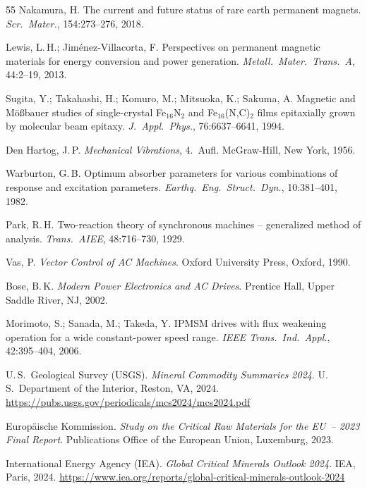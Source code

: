 ﻿\documentclass[12pt, a4paper]{report}
\theoremstyle{definition}
\theoremstyle{remark}
\begin{document}
\begin{thebibliography}{55}
  Nakamura, H.
  The current and future status of rare earth permanent magnets.
  \textit{Scr.\ Mater.}, 154:273--276, 2018.

  Lewis, L.\,H.; Jim\'enez-Villacorta, F.
  Perspectives on permanent magnetic materials for energy conversion
  and power generation.
  \textit{Metall.\ Mater.\ Trans.\ A}, 44:2--19, 2013.

  Sugita, Y.; Takahashi, H.; Komuro, M.; Mitsuoka, K.; Sakuma, A.
  Magnetic and M\"{o}\ss bauer studies of single-crystal Fe$_{16}$N$_2$ and
  Fe$_{16}$(N,C)$_2$ films epitaxially grown by molecular beam epitaxy.
  \textit{J.\ Appl.\ Phys.}, 76:6637--6641, 1994.

  Den Hartog, J.\,P.
  \textit{Mechanical Vibrations}, 4.~Aufl.
  McGraw-Hill, New York, 1956.

  Warburton, G.\,B.
  Optimum absorber parameters for various combinations of response
  and excitation parameters.
  \textit{Earthq.\ Eng.\ Struct.\ Dyn.}, 10:381--401, 1982.

  Park, R.\,H.
  Two-reaction theory of synchronous machines -- generalized method of analysis.
  \textit{Trans.\ AIEE}, 48:716--730, 1929.

  Vas, P.
  \textit{Vector Control of AC Machines}.
  Oxford University Press, Oxford, 1990.

  Bose, B.\,K.
  \textit{Modern Power Electronics and AC Drives}.
  Prentice Hall, Upper Saddle River, NJ, 2002.

  Morimoto, S.; Sanada, M.; Takeda, Y.
  IPMSM drives with flux weakening operation for a wide constant-power speed range.
  \textit{IEEE Trans.\ Ind.\ Appl.}, 42:395--404, 2006.

  U.\,S.\ Geological Survey (USGS).
  \textit{Mineral Commodity Summaries 2024}.
  U.\,S.\ Department of the Interior, Reston, VA, 2024.
  {\small\url{https://pubs.usgs.gov/periodicals/mcs2024/mcs2024.pdf}}

  Europäische Kommission.
  \textit{Study on the Critical Raw Materials for the EU~-- 2023 Final Report}.
  Publications Office of the European Union, Luxemburg, 2023.

  International Energy Agency (IEA).
  \textit{Global Critical Minerals Outlook 2024}.
  IEA, Paris, 2024.
  {\small\url{https://www.iea.org/reports/global-critical-minerals-outlook-2024}}


\end{thebibliography}
\end{document}
